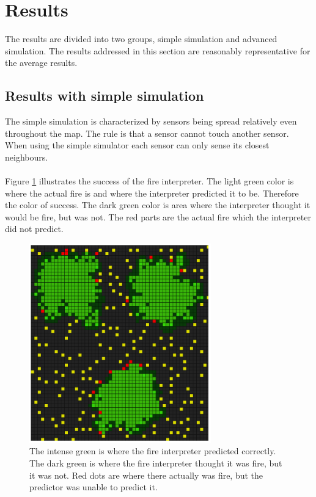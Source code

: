 \section{Results}
The results are divided into two groups, simple simulation and advanced simulation. The results addressed in this section are reasonably representative for the average results.
\subsection{Results with simple simulation}
The simple simulation is characterized by sensors being spread relatively even throughout the map. The rule is that a sensor cannot touch another sensor. When using the simple simulator each sensor can only sense its closest neighbours. 
\\\\
Figure \ref{fig:simple-results1} illustrates the success of the fire interpreter. The light green color is where the actual fire is and where the interpreter predicted it to be. Therefore the color of success. The dark green color is area where the interpreter thought it would be fire, but was not. The red parts are the actual fire which the interpreter did not predict. 
\begin{figure}[here]
  \centering
      \includegraphics[width=0.7\textwidth]{discussion/graphics/results-simple-compare.png}
  \caption{The intense green is where the fire interpreter predicted correctly. The dark green is where the fire interpreter thought it was fire, but it was not. Red dots are where there actually was fire, but the predictor was unable to predict it.}
  \label{fig:simple-results1}
\end{figure}
